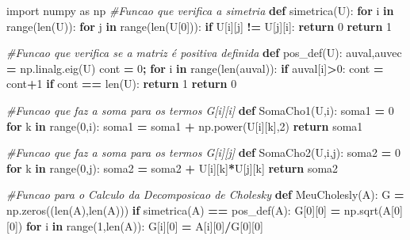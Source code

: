 \documentclass[
]{book}
\newenvironment{Shaded}{\begin{snugshade}}{\end{snugshade}}
\newcommand{\BuiltInTok}[1]{#1}
\newcommand{\CommentTok}[1]{\textcolor[rgb]{0.56,0.35,0.01}{\textit{#1}}}
\newcommand{\ControlFlowTok}[1]{\textcolor[rgb]{0.13,0.29,0.53}{\textbf{#1}}}
\newcommand{\DecValTok}[1]{\textcolor[rgb]{0.00,0.00,0.81}{#1}}
\newcommand{\ImportTok}[1]{#1}
\newcommand{\KeywordTok}[1]{\textcolor[rgb]{0.13,0.29,0.53}{\textbf{#1}}}
\newcommand{\NormalTok}[1]{#1}
\newcommand{\OperatorTok}[1]{\textcolor[rgb]{0.81,0.36,0.00}{\textbf{#1}}}
\begin{document}
\begin{Shaded}
\begin{Highlighting}[]
\ImportTok{import}\NormalTok{ numpy }\ImportTok{as}\NormalTok{ np}
\CommentTok{\#Funcao que verifica a simetria}
\KeywordTok{def}\NormalTok{ simetrica(U):}
  \ControlFlowTok{for}\NormalTok{ i }\KeywordTok{in} \BuiltInTok{range}\NormalTok{(}\BuiltInTok{len}\NormalTok{(U)):}
    \ControlFlowTok{for}\NormalTok{ j  }\KeywordTok{in} \BuiltInTok{range}\NormalTok{(}\BuiltInTok{len}\NormalTok{(U[}\DecValTok{0}\NormalTok{])):}
      \ControlFlowTok{if}\NormalTok{ U[i][j] }\OperatorTok{!=}\NormalTok{ U[j][i]:}
        \ControlFlowTok{return} \DecValTok{0}
  \ControlFlowTok{return} \DecValTok{1}

\CommentTok{\#Funcao que verifica se a matriz é positiva definida}
\KeywordTok{def}\NormalTok{ pos\_def(U):}
\NormalTok{  auval,auvec }\OperatorTok{=}\NormalTok{ np.linalg.eig(U)}
\NormalTok{  cont }\OperatorTok{=} \DecValTok{0}\OperatorTok{;}
  \ControlFlowTok{for}\NormalTok{ i }\KeywordTok{in} \BuiltInTok{range}\NormalTok{(}\BuiltInTok{len}\NormalTok{(auval)):}
    \ControlFlowTok{if}\NormalTok{ auval[i]}\OperatorTok{\textgreater{}}\DecValTok{0}\NormalTok{:}
\NormalTok{      cont }\OperatorTok{=}\NormalTok{ cont}\OperatorTok{+}\DecValTok{1}
  \ControlFlowTok{if}\NormalTok{ cont }\OperatorTok{==} \BuiltInTok{len}\NormalTok{(U):}
    \ControlFlowTok{return} \DecValTok{1}
  \ControlFlowTok{return} \DecValTok{0}

\CommentTok{\#Funcao que faz a soma para os termos G[i][i]}
\KeywordTok{def}\NormalTok{ SomaCho1(U,i):}
\NormalTok{  soma1 }\OperatorTok{=} \DecValTok{0}
  \ControlFlowTok{for}\NormalTok{ k }\KeywordTok{in} \BuiltInTok{range}\NormalTok{(}\DecValTok{0}\NormalTok{,i):}
\NormalTok{    soma1 }\OperatorTok{=}\NormalTok{ soma1 }\OperatorTok{+}\NormalTok{ np.power(U[i][k],}\DecValTok{2}\NormalTok{)}
  \ControlFlowTok{return}\NormalTok{ soma1}

\CommentTok{\#Funcao que faz a soma para os termos G[i][j]}
\KeywordTok{def}\NormalTok{ SomaCho2(U,i,j):}
\NormalTok{  soma2 }\OperatorTok{=} \DecValTok{0}
  \ControlFlowTok{for}\NormalTok{ k }\KeywordTok{in} \BuiltInTok{range}\NormalTok{(}\DecValTok{0}\NormalTok{,j):}
\NormalTok{    soma2 }\OperatorTok{=}\NormalTok{ soma2 }\OperatorTok{+}\NormalTok{ U[i][k]}\OperatorTok{*}\NormalTok{U[j][k]}
  \ControlFlowTok{return}\NormalTok{ soma2}

\CommentTok{\#Funcao para o Calculo da Decomposicao de Cholesky}
\KeywordTok{def}\NormalTok{ MeuCholesly(A):}
\NormalTok{  G }\OperatorTok{=}\NormalTok{ np.zeros((}\BuiltInTok{len}\NormalTok{(A),}\BuiltInTok{len}\NormalTok{(A)))}
  \ControlFlowTok{if}\NormalTok{ simetrica(A) }\OperatorTok{==}\NormalTok{ pos\_def(A):}
\NormalTok{    G[}\DecValTok{0}\NormalTok{][}\DecValTok{0}\NormalTok{] }\OperatorTok{=}\NormalTok{ np.sqrt(A[}\DecValTok{0}\NormalTok{][}\DecValTok{0}\NormalTok{])}
    \ControlFlowTok{for}\NormalTok{ i }\KeywordTok{in} \BuiltInTok{range}\NormalTok{(}\DecValTok{1}\NormalTok{,}\BuiltInTok{len}\NormalTok{(A)):}
\NormalTok{      G[i][}\DecValTok{0}\NormalTok{] }\OperatorTok{=}\NormalTok{ A[i][}\DecValTok{0}\NormalTok{]}\OperatorTok{/}\NormalTok{G[}\DecValTok{0}\NormalTok{][}\DecValTok{0}\NormalTok{]}
    

\end{Highlighting}
\end{Shaded}
\end{document}
